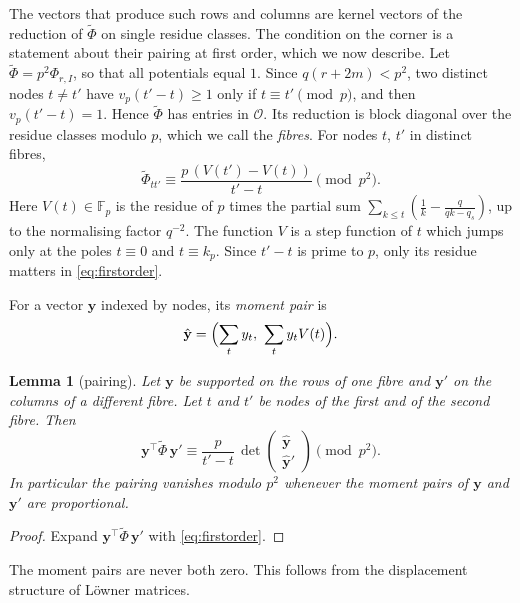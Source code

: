 \documentclass[11pt]{amsart}
\newtheorem{lemma}[theorem]{Lemma}
\theoremstyle{definition}
\theoremstyle{remark}
\numberwithin{equation}{section}
\newcommand{\F}{\mathbb F}
\newcommand{\cO}{\mathcal O}
\begin{document}
The vectors that produce such rows and columns are kernel vectors of the reduction of $\widetilde\Phi$ on single residue
classes. The condition on the corner is a statement about their pairing at first order, which we now describe. Let
$\widetilde\Phi=p^2\Phi_{r,I}$, so that all potentials equal $1$. Since $q(r+2m)<p^2$, two distinct nodes $t\ne t'$ have
$v_p(t'-t)\ge1$ only if $t\equiv t'\pmod p$, and then $v_p(t'-t)=1$. Hence $\widetilde\Phi$ has entries in $\cO$. Its
reduction is block diagonal over the residue classes modulo $p$, which we call the \emph{fibres}. For nodes $t$, $t'$
in distinct fibres,
\begin{equation}\label{eq:firstorder}
 \widetilde\Phi_{tt'}\equiv\frac{p\,(V(t')-V(t))}{t'-t}\pmod{p^2}.
\end{equation}
Here $V(t)\in\F_p$ is the residue of $p$ times the partial sum $\sum_{k\le t}(\frac1k-\frac q{qk-q_s})$, up to the
normalising factor $q^{-2}$. The function $V$ is a step function of $t$ which jumps only at the poles $t\equiv0$ and
$t\equiv k_p$. Since $t'-t$ is prime to $p$, only its residue matters in \eqref{eq:firstorder}.

For a vector $\mathbf y$ indexed by nodes, its \emph{moment pair} is
\[
 \hat{\mathbf y}=\Bigl(\sum_ty_t,\ \sum_ty_tV(t)\Bigr).
\]

\begin{lemma}[pairing]\label{lem:pairing}
Let $\mathbf y$ be supported on the rows of one fibre and $\mathbf y'$ on the columns of a different fibre. Let $t$ and
$t'$ be nodes of the first and of the second fibre. Then
\[
 \mathbf y^{\top}\widetilde\Phi\,\mathbf y'\equiv\frac p{t'-t}\,
 \det\begin{pmatrix}\hat{\mathbf y}\\ \hat{\mathbf y}'\end{pmatrix}\pmod{p^2}.
\]
In particular the pairing vanishes modulo $p^2$ whenever the moment pairs of $\mathbf y$ and $\mathbf y'$ are
proportional.
\end{lemma}
\begin{proof}
Expand $\mathbf y^{\top}\widetilde\Phi\,\mathbf y'$ with \eqref{eq:firstorder}.
\end{proof}

The moment pairs are never both zero. This follows from the displacement structure of L\"owner matrices.
\end{document}
